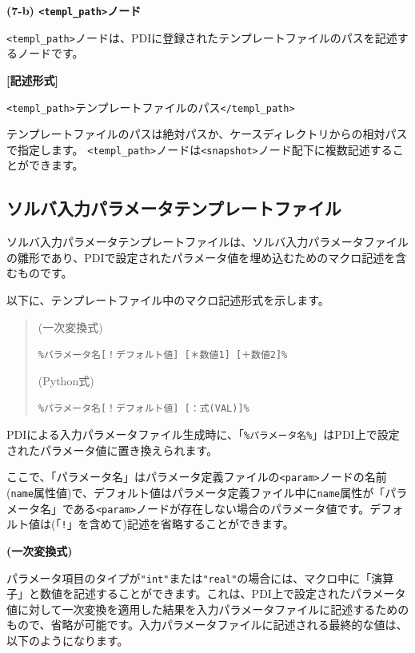 \documentclass[a4paper,11pt]{jarticle}
\begin{document}
{\vspace{12pt}
\textbf{(7-b) \texttt{<templ\_path>}ノード}

\texttt{<templ\_path>}ノードは、PDIに登録されたテンプレートファイルのパスを記述するノードです。

\vspace{8pt}
\leftskip=12pt
\textbf{[記述形式]}

\leftskip=42pt
\texttt{<templ\_path>}テンプレートファイルのパス\texttt{</templ\_path>}

\vspace{8pt}
\leftskip=0pt
テンプレートファイルのパスは絶対パスか、ケースディレクトリからの相対パスで指定します。
\texttt{<templ\_path>}ノードは\texttt{<snapshot>}ノード配下に複数記述することができます。

\newpage
\subsection{ソルバ入力パラメータテンプレートファイル}

ソルバ入力パラメータテンプレートファイルは、ソルバ入力パラメータファイルの雛形であり、PDIで設定されたパラメータ値を埋め込むためのマクロ記述を含むものです。

以下に、テンプレートファイル中のマクロ記述形式を示します。

\begin{quote}
(一次変換式)

{\tt \%パラメータ名[！デフォルト値] [＊数値1] [＋数値2]\%}

\medskip
(Python式)

{\tt \%パラメータ名[！デフォルト値] [：式(VAL)]\%}
\end{quote}

PDIによる入力パラメータファイル生成時に、「{\tt \%パラメータ名\%}」はPDI上で設定されたパラメータ値に置き換えられます。

ここで、「パラメータ名」はパラメータ定義ファイルの\texttt{<param>}ノードの名前({\tt name}属性値)で、デフォルト値はパラメータ定義ファイル中に{\tt name}属性が「パラメータ名」である\texttt{<param>}ノードが存在しない場合のパラメータ値です。デフォルト値は(「{\tt !}」を含めて)記述を省略することができます。

\medskip
{\bf (一次変換式)}

パラメータ項目のタイプが\texttt{"int"}または\texttt{"real"}の場合には、マクロ中に「演算子」と数値を記述することができます。これは、PDI上で設定されたパラメータ値に対して一次変換を適用した結果を入力パラメータファイルに記述するためのもので、省略が可能です。入力パラメータファイルに記述される最終的な値は、以下のようになります。

}
\end{document}
